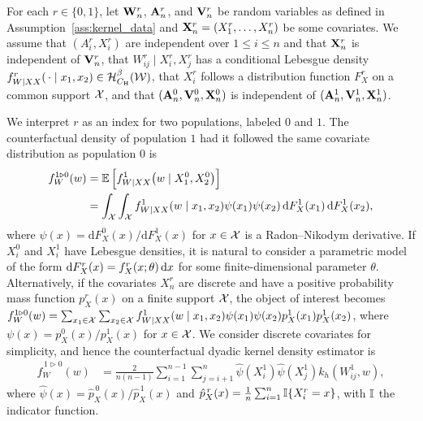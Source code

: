 For each $r \in \{0,1\}$, let $\mathbf{W}_n^r$, $\mathbf{A}_n^r$, and $\mathbf{V}_n^r$ be random
variables as defined in Assumption~\ref{ass:kernel_data} and
$\mathbf{X}_n^r = (X_1^r, \ldots, X_n^r)$ be some covariates.
We assume that $(A_i^r, X_i^r)$ are independent over $1 \leq i \leq n$
and that $\mathbf{X}_n^r$ is independent of $\mathbf{V}_n^r$, that
$W_{i j}^r \mid X_i^r, X_j^r$ has a conditional Lebesgue density
$f_{W \mid XX}^r(\,\cdot \mid x_1, x_2) \in \mathcal{H}^\beta_{C_{\mathrm{H}}}(\mathcal{W})$,
that $X_i^r$ follows a distribution function $F_X^r$ on a common support $\mathcal{X}$,
and that $(\mathbf{A}_n^0, \mathbf{V}_n^0, \mathbf{X}_n^0)$
is independent of $(\mathbf{A}_n^1, \mathbf{V}_n^1, \mathbf{X}_n^1)$.

We interpret $r$ as an index for two populations, labeled $0$ and $1$. The
counterfactual density of population $1$ had it followed the
same covariate distribution as population $0$ is
%
\begin{align*}
  f_W^{1 \triangleright 0}(w)
  &= \mathbb{E}\left[ f_{W \mid XX}^1\big(w \mid X_1^0, X_2^0\big) \right] \\
  &= \int_{\mathcal{X}} \int_{\mathcal{X}} f_{W \mid XX}^{1}(w \mid x_1, x_2)
  \psi(x_1) \psi(x_2) \,\mathrm{d}F_X^{1}(x_1) \,\mathrm{d}F_X^{1}(x_2),
\end{align*}
%
where $\psi(x) = \mathrm{d} F_X^0(x) / \mathrm{d} F_X^1(x)$ for $x \in \mathcal{X}$
is a Radon--Nikodym derivative. If $X^0_i$ and $X^1_i$ have Lebesgue densities,
it is natural to consider a parametric model of the form
$\mathrm{d} F_X^{r}(x)=f_X^r(x;\theta)\,\mathrm{d}x$
for some finite-dimensional parameter $\theta$.
Alternatively, if the covariates $X_n^r$ are discrete and have a positive
probability mass function $p_X^r(x)$ on a finite
support $\mathcal{X}$, the object of interest becomes
$f_W^{1 \triangleright 0}(w)
= \sum_{x_1 \in \mathcal{X}} \sum_{x_2 \in \mathcal{X}}
f_{W \mid XX}^{1}(w \mid x_1, x_2) \psi(x_1) \psi(x_2)
p_X^{1}(x_1) p_X^{1}(x_2)$,
where $\psi(x) = p_X^0(x)/p_X^1(x)$ for $x \in \mathcal{X}$.
We consider discrete covariates for simplicity,
and hence the counterfactual dyadic kernel density estimator is
%
\begin{align*}
  \hat f_W^{\,1 \triangleright 0}(w)
  &= \frac{2}{n(n-1)} \sum_{i=1}^{n-1} \sum_{j=i+1}^n
  \hat \psi(X_i^1) \hat \psi(X_j^1) k_h(W_{i j}^1, w),
\end{align*}
%
where $\hat\psi(x) = \hat p_X^{\,0}(x) / \hat p_X^{\,1}(x)$ and
$\hat p_X^{\,r}(x) = \frac{1}{n}\sum_{i = 1}^n \mathbb{I}\{X_i^r = x\}$,
with $\mathbb{I}$ the indicator function.


